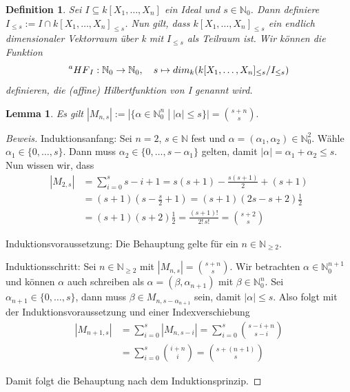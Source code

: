 \documentclass{article}
\newtheorem{definition}[satz]{Definition}
\newtheorem{lemma}[satz]{Lemma}
\newcommand*{\R}{k[X_{1},\ldots,X_{n}]}
\begin{document}
	\begin{definition} \label{1.2.11}
	Sei \(I \subseteq \R\) ein Ideal und \(s \in \mathbb{N}_{0}\). Dann definiere \(I_{\leq s} :=
	I \cap \R_{\leq s}\). Nun gilt, dass \(\R_{\leq s}\) ein endlich dimensionaler Vektorraum über
	k  mit \(I_{\leq s}\) als Teilraum ist. Wir können die Funktion \begin{displaymath}
	\prescript{a}{}{HF}_{I} : \mathbb{N}_{0} \rightarrow \mathbb{N}_{0}, \quad s \mapsto
	dim_{k}(\R_{\leq s}/I_{\leq s})	\end{displaymath} definieren, die (affine) Hilbertfunktion
	von I genannt wird.
	\end{definition}

	
	\begin{lemma}
	Es gilt \(|M_{n,s}| := |\{\alpha \in \mathbb{N}^{n}_{0}\; |\; |\alpha| \leq s \}| = \binom{s + n}{s}. \)
	\end{lemma}

	\begin{proof}[Beweis]
	Induktionsanfang: Sei \(n = 2\), \(s \in \mathbb{N}\) fest und \(\alpha = (\alpha_{1}, 
	\alpha_{2}) \in \mathbb{N}^{2}_{0}\). Wähle \(\alpha_{1} \in \{0, \ldots, s\}\). Dann muss
	\(\alpha_{2} \in \{0, \ldots, s - \alpha_{1}\}\) gelten, damit \(|\alpha| = \alpha_{1} +
	\alpha_{2} \leq s\). Nun wissen wir, dass
	\begin{align*}
		|M_{2,s}| &= \sum_{i=0}^{s} s-i+1 = s(s+1) - \frac{s(s+1)}{2} + (s+1) \\
		&= (s+1)(s - \frac{s}{2} + 1) = (s+1)(2s - s +2)\frac{1}{2} \\
		&= (s+1)(s+2)\frac{1}{2} = \frac{(s+1)!}{2!\,s!} = \binom{s+2}{s}
	\end{align*}
	
	Induktionsvoraussetzung: Die Behauptung gelte für ein \(n \in \mathbb{N}_{\geq 2}\).

	Induktionsschritt: Sei \(n \in \mathbb{N}_{\geq 2}\) mit \(|M_{n,s}| = \binom{s + n}{s}\). Wir
	betrachten \(\alpha \in \mathbb{N}^{n+1}_{0}\) und können \(\alpha\) auch schreiben als
	\(\alpha = (\beta, \alpha_{n+1})\) mit \(\beta \in \mathbb{N}^{n}_{0}\). Sei \(\alpha_{n+1}
	\in \{0, \ldots, s\}\), dann muss \(\beta \in M_{n,s-\alpha_{n+1}}\) sein, damit
	\(|\alpha| \leq s\). Also folgt mit der Induktionsvoraussetzung und einer Indexverschiebung
	\begin{align*}
		|M_{n+1,s}| &= \sum_{i=0}^{s} |M_{n,s-i}| = \sum_{i=0}^{s} \binom{s-i+n}{s-i} \\
		&= \sum_{i=0}^{s} \binom{i+n}{i} = \binom{s+(n+1)}{s}
	\end{align*}

	Damit folgt die Behauptung nach dem Induktionsprinzip.
	\end{proof}
\end{document}
